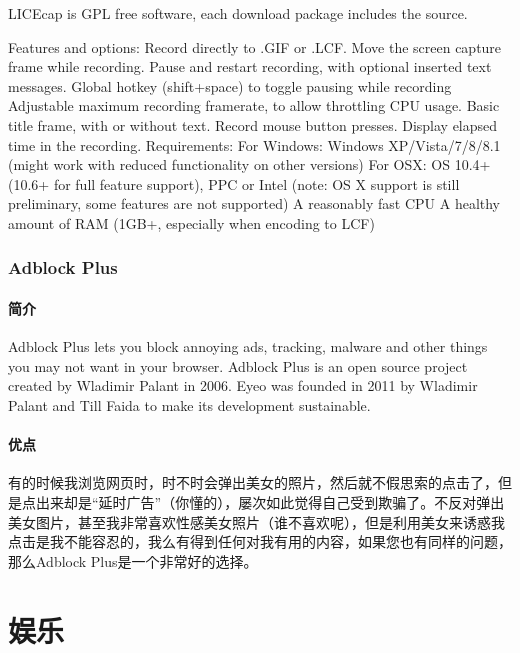 \documentclass[paper=a4,fontsize=11pt]{article}
\begin{document}
	LICEcap is GPL free software, each download package includes the source. 
	
	Features and options:
	Record directly to .GIF or .LCF.
	Move the screen capture frame while recording.
	Pause and restart recording, with optional inserted text messages.
	Global hotkey (shift+space) to toggle pausing while recording
	Adjustable maximum recording framerate, to allow throttling CPU usage.
	Basic title frame, with or without text.
	Record mouse button presses.
	Display elapsed time in the recording.
	Requirements:
	For Windows: Windows XP/Vista/7/8/8.1 (might work with reduced functionality on other versions)
	For OSX: OS 10.4+ (10.6+ for full feature support), PPC or Intel (note: OS X support is still preliminary, some features are not supported)
	A reasonably fast CPU
	A healthy amount of RAM (1GB+, especially when encoding to LCF)
	
	\section{Adblock Plus}
	
	\subsection{简介}
	
	Adblock Plus lets you block annoying ads, tracking, malware and other things you may not want in your browser. Adblock Plus is an open source project created by Wladimir Palant in 2006. Eyeo was founded in 2011 by Wladimir Palant and Till Faida to make its development sustainable.
	
	
	\subsection{优点}
	
	有的时候我浏览网页时，时不时会弹出美女的照片，然后就不假思索的点击了，但是点出来却是“延时广告”（你懂的），屡次如此觉得自己受到欺骗了。不反对弹出美女图片，甚至我非常喜欢性感美女照片（谁不喜欢呢），但是利用美女来诱惑我点击是我不能容忍的，我么有得到任何对我有用的内容，如果您也有同样的问题，那么Adblock Plus是一个非常好的选择。
	
	\clearpage
	
	\part{娱乐}
	
	\clearpage
	
\end{document}
